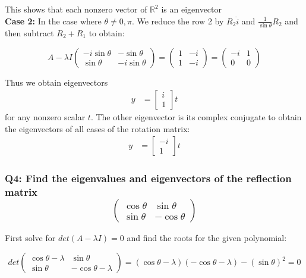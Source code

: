 \documentclass[8pt]{article}
\begin{document}
{{This shows that each nonzero vector of $\mathbb{R}^{2}$ is an eigenvector \\

\textbf{Case 2:} In the case where $ \theta \neq 0, \pi$. We reduce the row 2 by $R_2 \dot i$ and $\frac{1}{\sin \theta} R_2$ and then subtract $R_2 + R_1$ to obtain: 

$$
A - \lambda I
\begin{pmatrix}
 -i \sin \theta & -\sin \theta \\
\sin \theta & -i \sin \theta 
\end{pmatrix} = 
\begin{pmatrix}
 1 & -i \\
1 & -i 
\end{pmatrix} =
\begin{pmatrix}
 -i & 1 \\
0 & 0 
\end{pmatrix}
$$

Thus we obtain eigenvectors   
\begin{align}
    y &= \begin{bmatrix}
           i \\
        1
         \end{bmatrix}t 
\end{align}
for any nonzero scalar $t$. The other eigenvector is its complex conjugate to obtain the eigenvectors of all cases of the rotation matrix: 
\begin{align}
    y &= \begin{bmatrix}
           -i \\
           1
         \end{bmatrix}t 
\end{align}




\subsubsection*{Q4: Find the eigenvalues and eigenvectors of the reflection matrix
$$
\begin{pmatrix}
\cos \theta & \sin \theta \\
\sin \theta & -\cos \theta
\end{pmatrix}
$$}

First solve for $det(A- \lambda I) = 0$ and find the roots for the given polynomial:

$$
det \begin{pmatrix}
\cos \theta - \lambda & \sin \theta \\
\sin \theta & -\cos \theta - \lambda
\end{pmatrix} = (\cos \theta - \lambda) (-\cos \theta - \lambda) - (\sin \theta)^{2} = 0 
$$

}}
\end{document}
